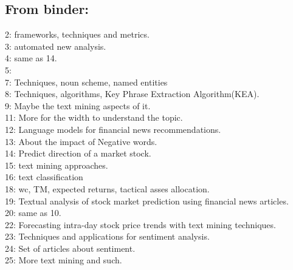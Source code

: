 \subsection{From binder:}
2: frameworks, techniques and metrics.\\
3: automated new analysis.\\
4: same as 14. \\
5:\\
7: Techniques, noun scheme, named entities \\
8: Techniques, algorithms, Key Phrase Extraction Algorithm(KEA).\\
9: Maybe the text mining aspects of it. \\
11: More for the width to understand the topic. \\
12: Language models for financial news recommendations. \\
13: About the impact of Negative words. \\
14: Predict direction of a market stock. \\
15: text mining approaches. \\
16: text classification\\
18: wc, TM, expected returns, tactical asses allocation. \\
19: Textual analysis of stock market prediction using financial news articles. \\
20: same as 10.\\
22: Forecasting intra-day stock price trends with text mining techniques.\\
23: Techniques and applications for sentiment analysis. \\
24: Set of articles about sentiment. \\
25: More text mining and such. \\


